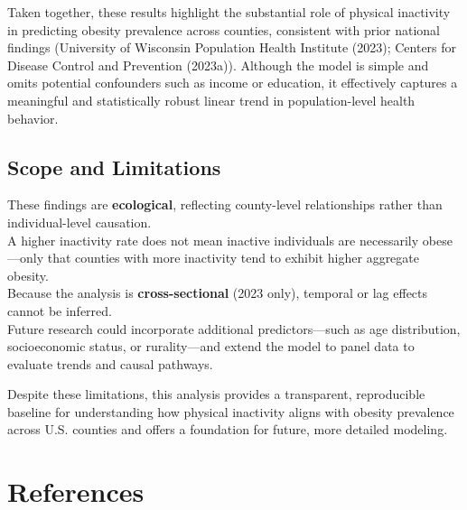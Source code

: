 \documentclass[
  letterpaper,
  DIV=11,
  numbers=noendperiod]{scrartcl}
\begin{document}
Taken together, these results highlight the substantial role of physical
inactivity in predicting obesity prevalence across counties, consistent
with prior national findings (University of Wisconsin Population Health
Institute (2023); Centers for Disease Control and Prevention (2023a)).
Although the model is simple and omits potential confounders such as
income or education, it effectively captures a meaningful and
statistically robust linear trend in population-level health behavior.

\subsection{Scope and Limitations}\label{scope-and-limitations}

These findings are \textbf{ecological}, reflecting county-level
relationships rather than individual-level causation.\\
A higher inactivity rate does not mean inactive individuals are
necessarily obese---only that counties with more inactivity tend to
exhibit higher aggregate obesity.\\
Because the analysis is \textbf{cross-sectional} (2023 only), temporal
or lag effects cannot be inferred.\\
Future research could incorporate additional predictors---such as age
distribution, socioeconomic status, or rurality---and extend the model
to panel data to evaluate trends and causal pathways.

Despite these limitations, this analysis provides a transparent,
reproducible baseline for understanding how physical inactivity aligns
with obesity prevalence across U.S. counties and offers a foundation for
future, more detailed modeling.

\section*{References}\label{references}
\end{document}
